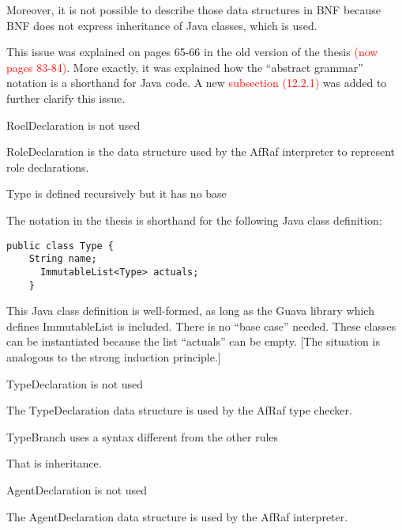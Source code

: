 \documentclass{article}
\newcommand*\R[1]{\textcolor{red}{#1}} %
\newenvironment{them}{\noindent\begingroup\color{blue}}{\endgroup\par}
\begin{document}
Moreover, it is not possible to describe those data structures in BNF because
BNF does not express inheritance of Java classes, which is used.

This issue was explained on pages 65-66 in the old version of the thesis
\R{(now pages 83-84)}. More exactly, it was explained how the ``abstract
grammar'' notation is a shorthand for Java code. A new \R{subsection (12.2.1)}
was added to further clarify this issue. 

\begin{them}

RoelDeclaration is not used 

\end{them}
RoleDeclaration is the data structure used by the AfRaf interpreter to
represent role declarations.

\begin{them}

Type is defined recursively but it has no base 

\end{them}
The notation in the thesis is shorthand for the following Java class definition:
\begin{verbatim}
public class Type {
    String name;
      ImmutableList<Type> actuals;
    }
\end{verbatim}

This Java class definition is well-formed, as long as the Guava library which
defines ImmutableList is included. There is no ``base case'' needed. These
classes can be instantiated because the list ``actuals'' can be empty. [The
situation is analogous to the strong induction principle.]

\begin{them}

TypeDeclaration is not used 

\end{them}
The TypeDeclaration data structure is used by the AfRaf type checker.

\begin{them}

TypeBranch uses a syntax different from the other rules 

\end{them}
That is inheritance. 

\begin{them}

AgentDeclaration is not used 

\end{them}
The AgentDeclaration data structure is used by the AfRaf interpreter.
\end{document}
